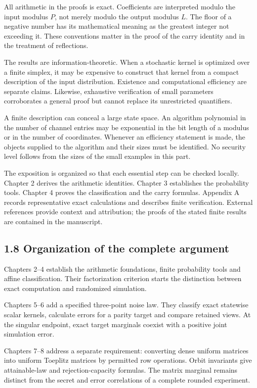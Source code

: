 \documentclass[
]{article}
\begin{document}
All arithmetic in the proofs is exact. Coefficients are interpreted
modulo the input modulus \(P\), not merely modulo the output modulus
\(L\). The floor of a negative number has its mathematical meaning as
the greatest integer not exceeding it. These conventions matter in the
proof of the carry identity and in the treatment of reflections.

The results are information-theoretic. When a stochastic kernel is
optimized over a finite simplex, it may be expensive to construct that
kernel from a compact description of the input distribution. Existence
and computational efficiency are separate claims. Likewise, exhaustive
verification of small parameters corroborates a general proof but cannot
replace its unrestricted quantifiers.

A finite description can conceal a large state space. An algorithm
polynomial in the number of channel entries may be exponential in the
bit length of a modulus or in the number of coordinates. Whenever an
efficiency statement is made, the objects supplied to the algorithm and
their sizes must be identified. No security level follows from the sizes
of the small examples in this part.

The exposition is organized so that each essential step can be checked
locally. Chapter 2 derives the arithmetic identities. Chapter 3
establishes the probability tools. Chapter 4 proves the classification
and the carry formulas. Appendix A records representative exact
calculations and describes finite verification. External references
provide context and attribution; the proofs of the stated finite results
are contained in the manuscript.

\subsection{1.8 Organization of the complete
argument}\label{organization-of-the-complete-argument}

Chapters 2--4 establish the arithmetic foundations, finite probability
tools and affine classification. Their factorization criterion starts
the distinction between exact computation and randomized simulation.

Chapters 5--6 add a specified three-point noise law. They classify exact
statewise scalar kernels, calculate errors for a parity target and
compare retained views. At the singular endpoint, exact target marginals
coexist with a positive joint simulation error.

Chapters 7--8 address a separate requirement: converting dense uniform
matrices into uniform Toeplitz matrices by permitted row operations.
Orbit invariants give attainable-law and rejection-capacity formulas.
The matrix marginal remains distinct from the secret and error
correlations of a complete rounded experiment.
\end{document}
